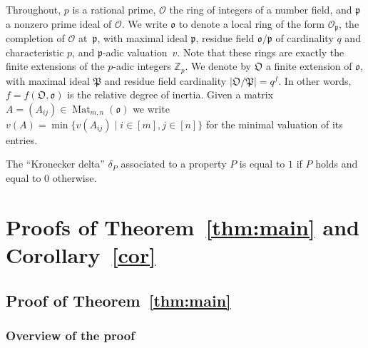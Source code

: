 \documentclass[11pt]{amsart}
\numberwithin{equation}{section}
\numberwithin{figure}{section}
\theoremstyle{plain}
\theoremstyle{definition}
\theoremstyle{remark}
\begin{document}
Throughout, $p$ is a rational prime, ${\ensuremath{\mathcal{O}}}$ the ring of integers of a
number field, and ${\mathfrak{p}}$ a nonzero prime ideal of ${\ensuremath{\mathcal{O}}}$. We write
${\mathfrak o}$ to denote a local ring of the form ${\ensuremath{\mathcal{O}}}_{\mathfrak{p}}$, the completion
of ${\ensuremath{\mathcal{O}}}$ at~${\mathfrak{p}}$, with maximal ideal ${\mathfrak{p}}$, residue field ${\mathfrak o} /
{\mathfrak{p}}$ of cardinality $q$ and characteristic $p$, and ${\mathfrak{p}}$-adic
valuation~$v$. Note that these rings are exactly the finite extensions
of the $p$-adic integers ${\ensuremath{\mathbb{Z}_p}}$. We denote by ${\mathfrak O}$ a finite extension
of ${\mathfrak o}$, with maximal ideal ${\mathfrak{P}}$ and residue field cardinality
$|{\mathfrak O} / {\mathfrak{P}}|= q^f$. In other words, $f=f({\mathfrak O},{\mathfrak o})$ is the relative
degree of inertia. Given a matrix $A =(A_{ij})\in \operatorname{Mat}_{m,n}({\mathfrak o})$ we
write $v(A)= \min\{v(A_{ij}) \mid i\in[m], j\in[n]\}$ for the minimal
valuation of its entries.

The ``Kronecker delta'' $\delta_P$ associated to a property $P$ is
equal to $1$ if $P$ holds and equal to $0$ otherwise.

\section{Proofs of Theorem~\ref{thm:main} and
  Corollary~\ref{cor}}\label{sec:proof}

\subsection{Proof of
  Theorem~\ref{thm:main}}\label{subsec:proof.main.thm}
\subsubsection{Overview of the proof}
\end{document}
